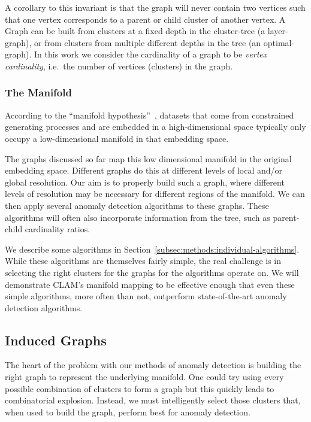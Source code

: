A corollary to this invariant is that the graph will never contain two vertices such that one vertex corresponds to a parent or child cluster of another vertex.
A Graph can be built from clusters at a fixed depth in the cluster-tree (a layer-graph), or from clusters from multiple different depths in the tree (an optimal-graph).
In this work we consider the cardinality of a graph to be \textit{vertex cardinality}, i.e.\ the number of vertices (clusters) in the graph.

\subsubsection{The Manifold}
According to the ``manifold hypothesis''~\cite{fefferman2016testing},
datasets that come from constrained generating processes and are embedded in a high-dimensional space typically only occupy a low-dimensional manifold in that embedding space.

The graphs discussed so far map this low dimensional manifold in the original embedding space.
Different graphs do this at different levels of local and/or global resolution.
Our aim is to properly build such a graph, where different levels of resolution may be necessary for different regions of the manifold.
We can then apply several anomaly detection algorithms to these graphs.
These algorithms will often also incorporate information from the tree, such as parent-child cardinality ratios.

We describe some algorithms in Section~\ref{subsec:methods:individual-algorithms}.
While these algorithms are themselves fairly simple, the real challenge is in selecting the right clusters for the graphs for the algorithms operate on.
We will demonstrate CLAM's manifold mapping to be effective enough that even these simple algorithms, more often than not, outperform state-of-the-art anomaly detection algorithms.

\subsection{Induced Graphs}
\label{subsec:methods:induced-graphs}
The heart of the problem with our methods of anomaly detection is building the right graph to represent the underlying manifold.
One could try using every possible combination of clusters to form a graph but this quickly leads to combinatorial explosion.
Instead, we must intelligently select those clusters that, when used to build the graph, perform best for anomaly detection.

